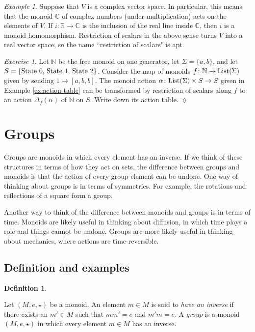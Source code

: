 \documentclass{book}
\def\tn{\textnormal}
\def\RR{{\mathbb R}}
\def\CC{{\mathbb C}}
\def\NN{{\mathbb N}}
\def\List{\tn{List}}
\def\to{\rightarrow}
\def\taking{\colon}
\theoremstyle{remark}
\newtheorem{example}[subsubsection]{Example}
\newtheorem{exc}[subsubsection]{Exercise}
\newenvironment{exercise}{\begin{exc}}{\hspace*{\fill}$\lozenge$\end{exc}}
\theoremstyle{definition}
\newtheorem{definition}[subsubsection]{Definition}
\begin{document}
\begin{example}

Suppose that $V$ is a complex vector space. In particular, this means that the monoid $\CC$ of complex numbers (under multiplication) acts on the elements of $V$. If $i\taking\RR\to\CC$ is the inclusion of the real line inside $\CC$, then $i$ is a monoid homomorphism. Restriction of scalars in the above sense turns $V$ into a real vector space, so the name ``restriction of scalars" is apt.

\end{example}

\begin{exercise}
Let $\NN$ be the free monoid on one generator, let $\Sigma=\{a,b\}$, and let $S=\{\tn{State 0, State 1, State 2}\}$. Consider the map of monoids $f\taking\NN\to\List(\Sigma)$ given by sending $1\mapsto [a,b,b]$. The monoid action $\alpha\taking\List(\Sigma)\times S\to S$ given in Example \ref{ex:action table} can be transformed by restriction of scalars along $f$ to an action $\Delta_f(\alpha)$ of $\NN$ on $S$. Write down its action table.
\end{exercise}


\section{Groups}\label{sec:groups}

Groups are monoids in which every element has an inverse. If we think of these structures in terms of how they act on sets, the difference between groups and monoids is that the action of every group element can be undone. One way of thinking about groups is in terms of symmetries. For example, the rotations and reflections of a square form a group. 

Another way to think of the difference between monoids and groups is in terms of time. Monoids are likely useful in thinking about diffusion, in which time plays a role and things cannot be undone. Groups are more likely useful in thinking about mechanics, where actions are time-reversible. 


\subsection{Definition and examples}

\begin{definition}\label{def:group}

Let $(M,e,\star)$ be a monoid. An element $m\in M$ is said to {\em have an inverse} if there exists an $m'\in M$ such that $mm'=e$ and $m'm=e$. A {\em group} is a monoid $(M,e,\star)$ in which every element $m\in M$ has an inverse.

\end{definition}
\end{document}
